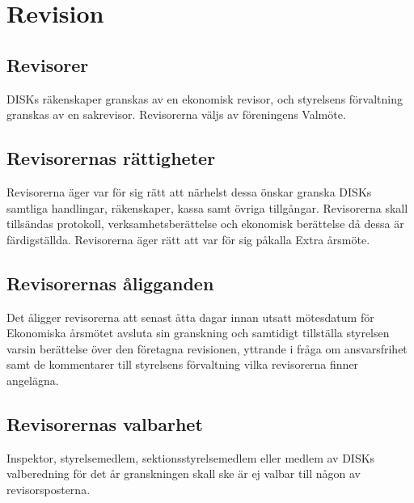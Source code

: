 \clearpage


\section{Revision}
\label{sec:revision}

	\subsection{Revisorer}
	\label{subsec:revisorer}
		DISKs räkenskaper granskas av en ekonomisk revisor, och styrelsens förvaltning granskas av en sakrevisor. Revisorerna väljs av föreningens Valmöte.

	\subsection{Revisorernas rättigheter}
	\label{subsec:revisornsrattigheter}
		Revisorerna äger var för sig rätt att närhelst dessa önskar granska DISKs samtliga handlingar, räkenskaper, kassa samt övriga tillgångar. Revisorerna skall tillsändas protokoll, verksamhetsberättelse och ekonomisk berättelse då dessa är färdigställda. Revisorerna äger rätt att var för sig påkalla Extra årsmöte.

	\subsection{Revisorernas åligganden}
	\label{subsec:revisornsaligganden}
		Det åligger revisorerna att senast åtta dagar innan utsatt mötesdatum för Ekonomiska årsmötet avsluta sin granskning och samtidigt tillställa styrelsen varsin berättelse över den företagna revisionen, yttrande i fråga om ansvarsfrihet samt de kommentarer till styrelsens förvaltning vilka revisorerna finner angelägna.

	\subsection{Revisorernas valbarhet}
	\label{subsec:revisorsvalbarhet}
		Inspektor, styrelsemedlem, sektionsstyrelsemedlem eller medlem av DISKs valberedning för det år granskningen skall ske är ej valbar till någon av revisorsposterna.

